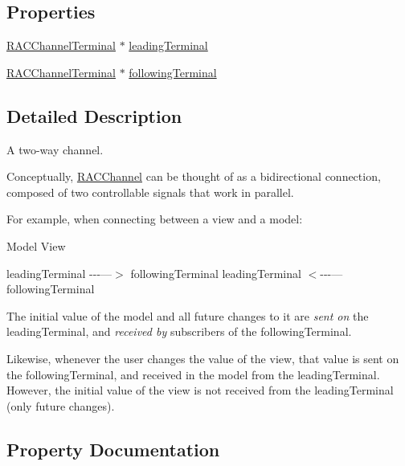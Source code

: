 \subsection*{Properties}
\begin{DoxyCompactItemize}
\item 
\mbox{\hyperlink{interface_r_a_c_channel_terminal}{R\+A\+C\+Channel\+Terminal}} $\ast$ \mbox{\hyperlink{interface_r_a_c_channel_a945eadc4078674ea25b68fd27a671448}{leading\+Terminal}}
\item 
\mbox{\hyperlink{interface_r_a_c_channel_terminal}{R\+A\+C\+Channel\+Terminal}} $\ast$ \mbox{\hyperlink{interface_r_a_c_channel_a8326f37513bcdf56076c1a131d07d523}{following\+Terminal}}
\end{DoxyCompactItemize}


\subsection{Detailed Description}
A two-\/way channel.

Conceptually, \mbox{\hyperlink{interface_r_a_c_channel}{R\+A\+C\+Channel}} can be thought of as a bidirectional connection, composed of two controllable signals that work in parallel.

For example, when connecting between a view and a model\+: \begin{DoxyVerb}   Model                      View
\end{DoxyVerb}
 {\ttfamily leading\+Terminal} -\/-\/-\/---$>$ {\ttfamily following\+Terminal} {\ttfamily leading\+Terminal} $<$-\/-\/-\/--- {\ttfamily following\+Terminal}

The initial value of the model and all future changes to it are {\itshape sent on} the {\ttfamily leading\+Terminal}, and {\itshape received by} subscribers of the {\ttfamily following\+Terminal}.

Likewise, whenever the user changes the value of the view, that value is sent on the {\ttfamily following\+Terminal}, and received in the model from the {\ttfamily leading\+Terminal}. However, the initial value of the view is not received from the {\ttfamily leading\+Terminal} (only future changes). 

\subsection{Property Documentation}
\mbox{\label{interface_r_a_c_channel_a8326f37513bcdf56076c1a131d07d523}} 
